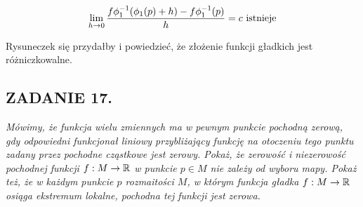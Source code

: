 \documentclass{article}
\begin{document}
$$\lim\limits_{h\to0}{f\phi_1^{-1}(\phi_1(p)+h)-f\phi_1^{-1}(p)\over h}=c\text{ istnieje}$$

Rysuneczek się przydałby i powiedzieć, że złożenie funkcji gładkich jest różniczkowalne.

\subsection*{ZADANIE 17.}
\emph{\color{pink}Mówimy, że funkcja wielu zmiennych ma w pewnym punkcie pochodną zerową, gdy odpowiedni funkcjonał liniowy przybliżający funkcję na otoczeniu tego punktu zadany przez pochodne cząstkowe jest zerowy. Pokaż, że zerowość i niezerowość pochodnej funkcji $f:M\to\mathbb{R}$ w punkcie $p\in M$ nie zależy od wyboru mapy. Pokaż też, że w każdym punkcie $p$ rozmaitości $M$, w którym funkcja gładka $f:M\to\mathbb{R}$ osiąga ekstremum lokalne, pochodna tej funkcji jest zerowa.}
\end{document}
